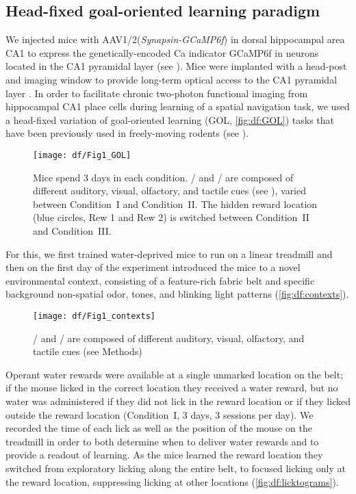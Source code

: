 \subsection{Head-fixed goal-oriented learning paradigm}
We injected mice with AAV1/2(\emph{Synapsin-GCaMP6f}) in dorsal hippocampal area CA1 to express the genetically-encoded Ca indicator GCaMP6f \citep{Chen2013} in neurons located in the CA1 pyramidal layer (see ).  Mice were implanted with a head-post and imaging window to provide long-term optical access to the CA1 pyramidal layer \citep{Danielson2016b, Kaifosh2013, Lovett-Barron2014}.  In order to facilitate chronic two-photon functional imaging from hippocampal CA1 place cells \citep{Danielson2016b, Dombeck2010} during learning of a spatial navigation task, we used a head-fixed variation of goal-oriented learning \citep{Danielson2016b} (GOL, \autoref{fig:df:GOL}) tasks that have been previously used in freely-moving rodents \citep{Dupret2010a} (see ).
\begin{figure}
	\centering
	\texttt{[image: df/Fig1\_GOL]}
	\caption[The three conditions of the GOL task]{Mice spend 3 days in each condition. \A/ and \Aprime/ are composed of different auditory, visual, olfactory, and tactile cues (see ), varied between Condition~I and Condition~II. The hidden reward location (blue circles, Rew 1 and Rew 2) is switched between Condition~II and Condition~III.}
	\label{fig:df:GOL}
\end{figure}
For this, we first trained water-deprived mice to run on a linear treadmill \citep{Danielson2016a, Danielson2016b, Royer2012} and then on the first day of the experiment introduced the mice to a novel environmental context, consisting of a feature-rich fabric belt and specific background non-spatial odor, tones, and blinking light patterns (\autoref{fig:df:contexts}).
\begin{figure}
	\centering
	\texttt{[image: df/Fig1\_contexts]}
	\caption[Components of the two distinct contexts used in the GOL task]{\A/ and \Aprime/ are composed of different auditory, visual, olfactory, and tactile cues (see Methods)}
	\label{fig:df:contexts}
\end{figure}
Operant water rewards were available at a single unmarked location on the belt; if the mouse licked in the correct location they received a water reward, but no water was administered if they did not lick in the reward location or if they licked outside the reward location (Condition~I, 3 days, 3 sessions per day).  We recorded the time of each lick as well as the position of the mouse on the treadmill in order to both determine when to deliver water rewards and to provide a readout of learning. As the mice learned the reward location they switched from exploratory licking along the entire belt, to focused licking only at the reward location, suppressing licking at other locations (\autoref{fig:df:licktograms}).
